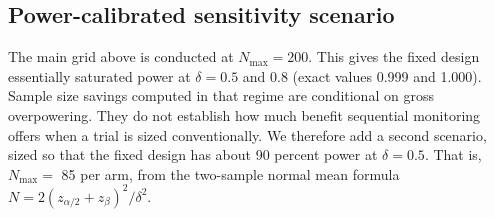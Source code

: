 \documentclass[
  11pt,
]{article}
\begin{document}
\begin{table}[!h]
\centering
\caption{\label{tab:power-table}Power and expected sample sizes under
    alternative hypotheses ($N_{\max} = 200$ per arm;
    power is at or near ceiling for $\delta \geq 0.5$,
    see the power-calibrated scenario below).}
\centering
{}
\end{table}

\subsection{Power-calibrated sensitivity scenario}\label{power-calibrated-sensitivity-scenario}

The main grid above is conducted at \(N_{\max} = 200\).
This gives the fixed design essentially saturated
power at \(\delta = 0.5\) and \(0.8\) (exact values
0.999 and
1.000).
Sample size savings computed in that regime are
conditional on gross overpowering. They do not
establish how much benefit sequential monitoring
offers when a trial is sized conventionally. We
therefore add a second scenario, sized so that the
fixed design has about 90 percent power at
\(\delta = 0.5\). That is, \(N_{\max} =\)
85 per arm, from the two-sample normal mean
formula \(N = 2(z_{\alpha/2} + z_\beta)^2 / \delta^2\).
\end{document}
